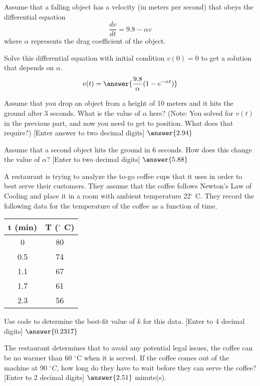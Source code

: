 \documentclass{ximera}
\begin{document}
\begin{exercise}
    Assume that a falling object has a velocity (in meters per second) that obeys the differential equation
    \begin{equation*}
        \frac{dv}{dt} = 9.8 - \alpha v
    \end{equation*}
    where $\alpha$ represents the drag coefficient of the object.
    
    Solve this differential equation with initial condition $v(0) = 0$ to get a solution that depends on $\alpha$. 
    \[
        v(t) = \answer{\frac{9.8}{\alpha}(1 - e^{-\alpha t})}
    \]
    \begin{problem}
        Assume that you drop an object from a height of 10 meters and it hits the ground after $3$ seconds. What is the value of $\alpha$ here? (Note: You solved for $v(t)$ in the previous part, and now you need to get to position. What does that require?) [Enter answer to two decimal digits] $\answer{2.94}$
        \begin{problem}
            Assume that a second object hits the ground in 6 seconds. How does this change the value of $\alpha$? [Enter to two decimal digits] $\answer{5.88}$
        \end{problem}
    \end{problem}
\end{exercise}

\begin{exercise}
    A restaurant is trying to analyze the to-go coffee cups that it uses in order to best serve their customers. They assume that the coffee follows Newton's Law of Cooling and place it in a room with ambient temperature 22$^\circ$ C. They record the following data for the temperature of the coffee as a function of time.
    \begin{table}[h!!]
        \centering
        \begin{tabular}{|c|c|}\hline
             \textbf{t} (min)& \textbf{T} ($^\circ$ C)  \\ \hline
            0 & 80 \\
             0.5 & 74 \\
             1.1 & 67 \\
             1.7 & 61 \\
             2.3 & 56 \\ \hline
        \end{tabular}
    \end{table}
    Use code to determine the best-fit value of $k$ for this data. [Enter to 4 decimal digits] $\answer{0.2317}$
    \begin{problem}
        The restaurant determines that to avoid any potential legal issues, the coffee can be no warmer than 60 $^\circ$C when it is served. If the coffee comes out of the machine at 90 $^\circ C$, how long do they have to wait before they can serve the coffee? [Enter to 2 decimal digits] $\answer{2.51}$ minute(s).
    \end{problem}
\end{exercise}
\end{document}
